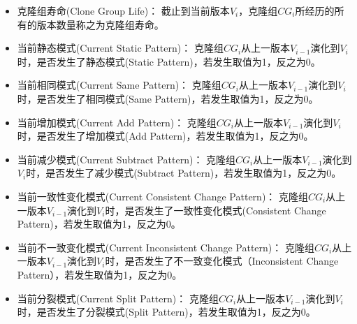 \begin{itemize}
\item
克隆组寿命(Clone Group Life)：
截止到当前版本$V_ i $，克隆组$CG_i$所经历的所有的版本数量称之为克隆组寿命。
\item
当前静态模式(Current Static Pattern)：
克隆组$CG_i$从上一版本$V_{i-1} $演化到$V_i $时，是否发生了静态模式(Static Pattern)，若发生取值为1，反之为0。
\item
当前相同模式(Current Same Pattern)：
克隆组$CG_i$从上一版本$V_{i-1} $演化到$V_i $时，是否发生了相同模式(Same Pattern)，若发生取值为1，反之为0。
\item
当前增加模式(Current Add Pattern)：
克隆组$CG_i$从上一版本$V_{i-1} $演化到$V_i $时，是否发生了增加模式(Add Pattern)，若发生取值为1，反之为0。
\item
当前减少模式(Current Subtract Pattern)：
克隆组$CG_i$从上一版本$V_{i-1} $演化到$V_i $时，是否发生了减少模式(Subtract Pattern)，若发生取值为1，反之为0。
\item
当前一致性变化模式(Current Consistent Change Pattern)：
克隆组$CG_i$从上一版本$V_{i-1} $演化到$V_i $时，是否发生了一致性变化模式(Consistent Change Pattern)，若发生取值为1，反之为0。
\item
当前不一致变化模式(Current Inconsistent Change Pattern)：
克隆组$CG_i$从上一版本$V_{i-1} $演化到$V_ i $时，是否发生了不一致变化模式（Inconsistent Change Pattern），若发生取值为1，反之为0。
\item
当前分裂模式(Current Split Pattern)：
克隆组$CG_i$从上一版本$V_{i-1} $演化到$V_i $时，是否发生了分裂模式(Split Pattern)，若发生取值为1，反之为0。
\end{itemize}

